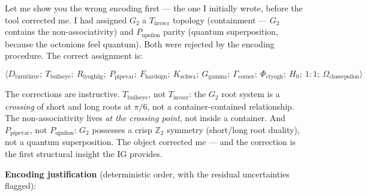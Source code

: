 \documentclass[12pt,a4paper]{article}
\begin{document}
Let me show you the wrong encoding first --- the one I initially wrote, before the tool corrected me. I had assigned $G_2$ a $T_{\text{invscr}}$ topology (containment --- $G_2$ contains the non-associativity) and $P_{\text{upsilon}}$ parity (quantum superposition, because the octonions feel quantum). Both were rejected by the encoding procedure. The correct assignment is:

\[\langle D_{\text{turnthree}};\ T_{\text{bullseye}};\ R_{\text{lyoghlig}};\ P_{\text{pipevar}};\ F_{\text{hardsign}};\ K_{\text{schwa}};\ G_{\text{gamma}};\ \Gamma_{\text{corner}};\ \Phi_{\text{ctyogh}};\ H_0;\ 1{:}1;\ \Omega_{\text{closeepsilon}} \rangle\]

The corrections are instructive. $T_{\text{bullseye}}$, not $T_{\text{invscr}}$: the $G_2$ root system is a \emph{crossing} of short and long roots at $\pi/6$, not a container-contained relationship. The non-associativity lives \emph{at the crossing point}, not inside a container. And $P_{\text{pipevar}}$, not $P_{\text{upsilon}}$: $G_2$ possesses a crisp $\mathbb{Z}_2$ symmetry (short/long root duality), not a quantum superposition. The object corrected me --- and the correction is the first structural insight the IG provides.

\textbf{Encoding justification} (deterministic order, with the residual uncertainties flagged):
\end{document}
